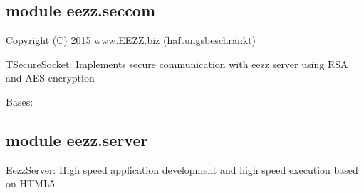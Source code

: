 \documentclass[letterpaper,10pt,english]{sphinxmanual}
\begin{document}
\subsection{module eezz.seccom}
\label{\detokenize{eezz:module-eezz.seccom}}\label{\detokenize{eezz:module-eezz-seccom}}
\sphinxAtStartPar
Copyright (C) 2015 www.EEZZ.biz (haftungsbeschränkt)

\sphinxAtStartPar
TSecureSocket:
Implements secure communication with eezz server
using RSA and AES encryption

\begin{savenotes}\begin{fulllineitems}
\label{\detokenize{eezz:eezz.seccom.TSecureSocket}}
\pysigstartsignatures
{}
\pysigstopsignatures
\sphinxAtStartPar
Bases: 

\begin{savenotes}\begin{fulllineitems}
\label{\detokenize{eezz:eezz.seccom.TSecureSocket.send_request}}
\pysigstartsignatures
{}
\pysigstopsignatures
\end{fulllineitems}\end{savenotes}


\end{fulllineitems}\end{savenotes}



\subsection{module eezz.server}
\label{\detokenize{eezz:module-eezz.server}}\label{\detokenize{eezz:module-eezz-server}}
\sphinxAtStartPar
EezzServer:
High speed application development and
high speed execution based on HTML5
\end{document}
